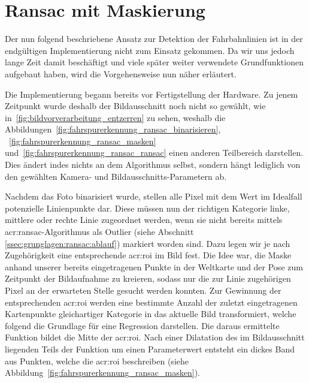 \section{Ransac mit Maskierung} 
\label{sec:maskenbau}

Der nun folgend beschriebene Ansatz zur Detektion der Fahrbahnlinien ist in der endgültigen Implementierung nicht zum Einsatz gekommen. Da wir uns jedoch lange Zeit damit beschäftigt und viele später weiter verwendete Grundfunktionen aufgebaut haben, wird die Vorgehensweise nun näher erläutert.

Die Implementierung begann bereits vor Fertigstellung der Hardware. Zu jenem Zeitpunkt wurde deshalb der Bildausschnitt noch nicht so gewählt, wie in~\ref{fig:bildvorverarbeitung_entzerren} zu sehen, weshalb die Abbildungen~\ref{fig:fahrspurerkennung_ransac_binarisieren}, ~\ref{fig:fahrspurerkennung_ransac_masken} und~\ref{fig:fahrspurerkennung_ransac_ransac} einen anderen Teilbereich darstellen. Dies ändert indes nichts an dem Algorithmus selbst, sondern hängt lediglich von den gewählten Kamera- und Bildausschnitts-Parametern ab. 

Nachdem das Foto binarisiert wurde, stellen alle Pixel mit dem Wert \grqq{} im Idealfall potenzielle Linienpunkte dar. Diese müssen nun der richtigen Kategorie \glqq linke\grqq , \glqq mittlere\grqq{} oder \glqq rechte\grqq{} Linie zugeordnet werden, wenn sie nicht bereits mittels \gls{acr:ransac}-Algorithmus als Outlier (siehe Abschnitt \ref{ssec:grunglagen:ransac:ablauf}) markiert worden sind. Dazu legen wir je nach Zugehörigkeit eine entsprechende \gls{acr:roi} im Bild fest. Die Idee war, die Maske anhand unserer bereits eingetragenen Punkte in der Weltkarte und der Pose zum Zeitpunkt der Bildaufnahme zu kreieren, sodass nur die zur Linie zugehörigen Pixel an der erwarteten Stelle gesucht werden konnten. 
Zur Gewinnung der entsprechenden \gls{acr:roi} werden eine bestimmte Anzahl der zuletzt eingetragenen Kartenpunkte gleichartiger Kategorie in das aktuelle Bild transformiert, welche folgend die Grundlage für eine Regression darstellen. Die daraus ermittelte Funktion bildet die Mitte der \gls{acr:roi}. Nach einer Dilatation des im Bildausschnitt liegenden Teils der Funktion um einen Parameterwert entsteht ein dickes Band aus Punkten, welche die \gls{acr:roi} beschreiben (siehe Abbildung~\ref{fig:fahrspurerkennung_ransac_masken}).

